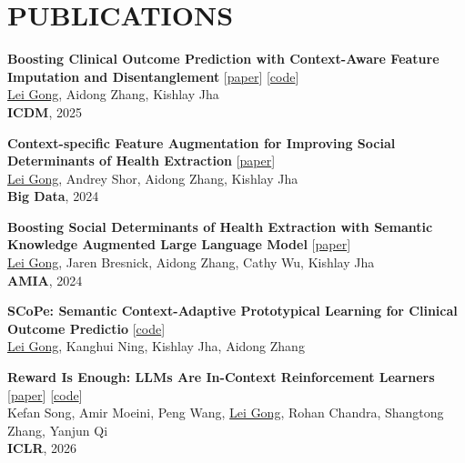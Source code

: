 \documentclass[10pt, letterpaper]{article}
\begin{document}
    \section{PUBLICATIONS}
        \begin{enumerate}[label={[\arabic*]}]
            
            \item \textbf{Boosting Clinical Outcome Prediction with Context-Aware Feature Imputation and Disentanglement} [\href{https://ieeexplore.ieee.org/abstract/document/11392038}{paper}] [\href{https://github.com/LeiGong0125Carrot/Strucure-Awared-Clinical-Note-Processing}{code}] \\
            \underline{Lei Gong}, Aidong Zhang, Kishlay Jha \\
            \textbf{ICDM}, 2025
            
            \item \textbf{Context-specific Feature Augmentation for Improving Social Determinants of Health Extraction} [\href{https://ieeexplore.ieee.org/abstract/document/10825225}{paper}] \\
            \underline{Lei Gong}, Andrey Shor, Aidong Zhang, Kishlay Jha  \\
            \textbf{Big Data}, 2024
            
            \item \textbf{Boosting Social Determinants of Health Extraction with Semantic Knowledge Augmented Large Language Model} [\href{https://pmc.ncbi.nlm.nih.gov/articles/PMC12099417/}{paper}]\\
            \underline{Lei Gong}, Jaren Bresnick, Aidong Zhang, Cathy Wu, Kishlay Jha  \\
            \textbf{AMIA}, 2024

            \item \textbf{SCoPe: Semantic Context-Adaptive Prototypical Learning for Clinical
Outcome Predictio} [\href{https://github.com/LeiGong0125Carrot/clinical_diffusion_generator/tree/concept_merging_vib}{code}] \\
            \underline{Lei Gong}, Kanghui Ning, Kishlay Jha, Aidong Zhang \\
            

            \item \textbf{Reward Is Enough: LLMs Are In-Context Reinforcement Learners} [\href{https://arxiv.org/abs/2506.06303}{paper}] [\href{https://github.com/garified/ICRL-for-LLM-Agent}{code}] \\
            Kefan Song, Amir Moeini, Peng Wang, \underline{Lei Gong}, Rohan Chandra, Shangtong Zhang, Yanjun Qi\\
            \textbf{ICLR}, 2026


\end{enumerate}
\end{document}
